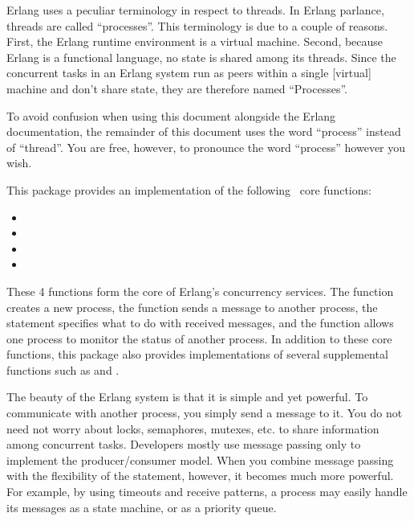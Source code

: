 \documentclass{howto}
\newcommand{\Erlang}{\ulink{Erlang}{http://www.erlang.org/}}
\begin{document}
\begin{notice}[note]
Erlang uses a peculiar terminology in respect to threads. In Erlang parlance,
threads are called ``processes''. This terminology is due to a couple of
reasons. First, the Erlang runtime environment is a virtual machine. Second,
because Erlang is a functional language, no state is shared among its threads.
Since the concurrent tasks in an Erlang system run as peers within a single
[virtual] machine and don't share state, they are therefore named ``Processes''.

To avoid confusion when using this document alongside the Erlang documentation,
the remainder of this document uses the word ``process'' instead of ``thread''.
You are free, however, to pronounce the word ``process'' however you wish.
\end{notice}

This package provides an implementation of the following \Erlang\ core
functions:
\begin{itemize}
	\item {}
	\item {}
	\item {}
	\item {}
\end{itemize}

These 4 functions form the core of Erlang's concurrency services. The
 function creates a new process, the 
function sends a message to another process, the  statement
specifies what to do with received messages, and the  function
allows one process to monitor the status of another process. In addition to
these core functions, this package also provides implementations of several
supplemental functions such as  and .

The beauty of the Erlang system is that it is simple and yet powerful. To
communicate with another process, you simply send a message to it. You do not
need not worry about locks, semaphores, mutexes, etc. to share information among
concurrent tasks. Developers mostly use message passing only to implement the
producer/consumer model. When you combine message passing with the flexibility
of the  statement, however, it becomes much more powerful. For
example, by using timeouts and receive patterns, a process may easily handle its
messages as a state machine, or as a priority queue.
\end{document}

